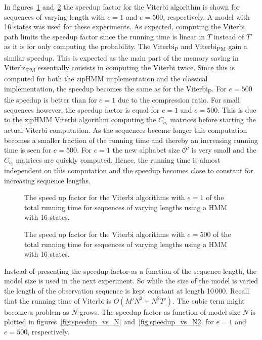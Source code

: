 In figures~\ref{fig:compressed_1_speedup_vs_sequence_length}
and~\ref{fig:compressed_500_speedup_vs_sequence_length} the speedup factor for
the Viterbi algorithm is shown for sequences of varying length with $e = 1$ and
$e = 500$, respectively. A model with 16 states was used for these experiments.
As expected, computing the Viterbi path limits the speedup factor since the
running time is linear in $T$ instead of $T'$ as it is for only computing the
probability. The Viterbi\textsubscript{P} and Viterbi\textsubscript{PM} gain a
similar speedup. This is expected as the main part of the memory saving in
Viterbi\textsubscript{PM} essentially consists in computing the Viterbi twice.
Since this is computed for both the zipHMM implementation and the classical
implementation, the speedup becomes the same as for the
Viterbi\textsubscript{P}. For $e = 500$ the speedup is better than for $e = 1$
due to the compression ratio. For small sequences however, the speedup factor
is equal for $e = 1$ and $e = 500$. This is due to the zipHMM Viterbi algorithm
computing the $C_{o_i}$ matrices before starting the actual Viterbi
computation. As the sequences become longer this computation becomes a smaller
fraction of the running time and thereby an increasing running time is seen for
$e = 500$. For $e = 1$ the new alphabet size $\mathcal{O'}$ is very small and
the $C_{o_i}$ matrices are quickly computed. Hence, the running time is almost
independent on this computation and the speedup becomes close to constant for
increasing sequence lengths.

\begin{figure}
  \centering
  
  \caption{The speed up factor for the Viterbi algorithms with $e = 1$ of the
    total running time for sequences of varying lengths using a HMM with 16
    states.}
  \label{fig:compressed_1_speedup_vs_sequence_length}
\end{figure}

\begin{figure}
  \centering
  
  \caption{The speed up factor for the Viterbi algorithms with $e = 500$ of the
    total running time for sequences of varying lengths using a HMM with 16
    states.}
  \label{fig:compressed_500_speedup_vs_sequence_length}
\end{figure}

Instead of presenting the speedup factor as a function of the sequence length,
the model size is used in the next experiment. So while the size of the model
is varied the length of the observation sequence is kept constant at length
10\,000. Recall that the running time of Viterbi is $O(M' N^3 + N^2 T')$. The
cubic term might become a problem as $N$ grows. The speedup factor as function
of model size $N$ is plotted in figures~\ref{fig:speedup_vs_N}
and~\ref{fig:speedup_vs_N2} for $e = 1$ and $e = 500$,
respectively.

